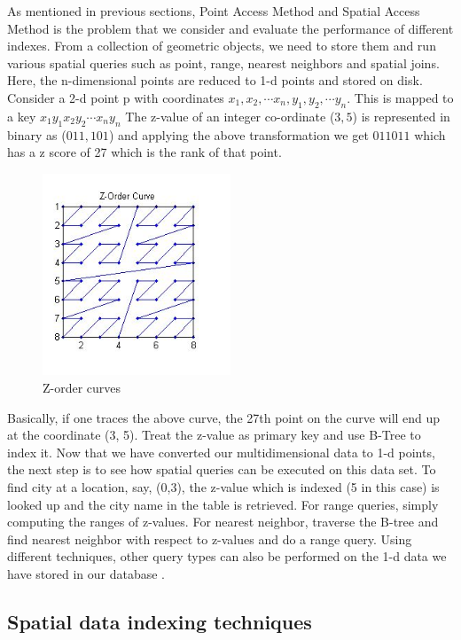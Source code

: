 \documentclass{sig-alternate-05-2015}
\begin{document}
As mentioned in previous sections, Point Access Method and Spatial Access Method is the problem that we consider and evaluate the performance of different indexes. From a collection of geometric objects, we need to store them and run various spatial queries such as point, range, nearest neighbors and spatial joins. Here, the n-dimensional points are reduced to 1-d points and stored on disk. Consider a 2-d point p with coordinates {$ x_1, x_2, \cdots x_n, y_1, y_2, \cdots y_n$}. This is mapped to a key $x_1y_1x_2y_2\cdots x_ny_n$  The z-value of an integer co-ordinate ($3,5$) is represented in binary as ($011, 101$) and applying the above transformation we get $011011$ which has a z score of 27 which is the rank of that point.
\begin{figure}[h!]
\centering
\includegraphics[width=0.5\textwidth]{z-curve.JPG}
\caption{Z-order curves}
\end{figure}
Basically, if one traces the above curve, the 27th point on the curve will end up at the coordinate (3, 5). Treat the z-value as primary key and use B-Tree to index it. Now that we have converted our multidimensional data to 1-d points, the next step is to see how spatial queries can be executed on this data set. To find city at a location, say, (0,3), the z-value which is indexed (5 in this case) is looked up and the city name in the table is retrieved. For range queries, simply computing the ranges of z-values. For nearest neighbor, traverse the B-tree and find nearest neighbor with respect to z-values and do a range query. Using different techniques, other query types can also be performed on the 1-d data we have stored in our database \cite{orenstein1986spatial}.  
\subsection{Spatial data indexing techniques}
\end{document}

